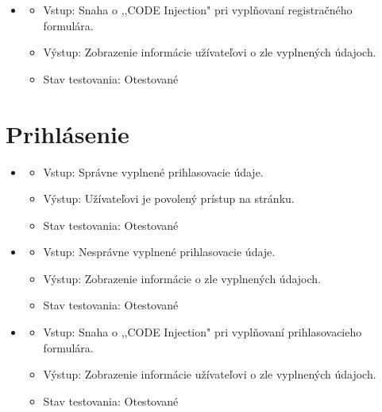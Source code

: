 \documentclass[12pt,a4paper]{report}
\theoremstyle{definition}
\theoremstyle{remark}
\begin{document}
\begin{itemize}
	\item\begin{itemize}
	\item Vstup: Snaha o ,,CODE Injection" pri vyplňovaní registračného formulára.
	\item Výstup: Zobrazenie informácie užívateľovi o zle vyplnených údajoch.
	\item Stav testovania: Otestované
	\end{itemize}
\end{itemize}
	

\section{Prihlásenie}
\begin{itemize}
	
	\item\begin{itemize}
	\item Vstup: Správne vyplnené prihlasovacie údaje.
	\item Výstup: Užívateľovi je povolený prístup na stránku.
	\item Stav testovania: Otestované
	\end{itemize}
	
	\item\begin{itemize}
	\item Vstup: Nesprávne vyplnené prihlasovacie údaje.
	\item Výstup: Zobrazenie informácie o zle vyplnených údajoch.
	\item Stav testovania: Otestované
	\end{itemize}
	
	\item\begin{itemize}
	\item Vstup: Snaha o ,,CODE Injection" pri vyplňovaní prihlasovacieho formulára.
	\item Výstup: Zobrazenie informácie užívateľovi o zle vyplnených údajoch.
	\item Stav testovania: Otestované
	\end{itemize}

\end{itemize}
\end{document}

